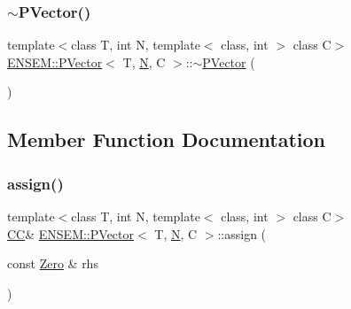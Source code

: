 \subsubsection{\texorpdfstring{$\sim$PVector()}{~PVector()}\hspace{0.1cm}{\footnotesize\ttfamily [3/3]}}
{\footnotesize\ttfamily template$<$class T, int N, template$<$ class, int $>$ class C$>$ \\
\mbox{\hyperlink{classENSEM_1_1PVector}{E\+N\+S\+E\+M\+::\+P\+Vector}}$<$ T, \mbox{\hyperlink{adat__devel_2lib_2hadron_2operator__name__util_8cc_a7722c8ecbb62d99aee7ce68b1752f337}{N}}, C $>$\+::$\sim$\mbox{\hyperlink{classENSEM_1_1PVector}{P\+Vector}} (\begin{DoxyParamCaption}{ }\end{DoxyParamCaption})\hspace{0.3cm}{\ttfamily [inline]}}



\subsection{Member Function Documentation}
\mbox{\label{classENSEM_1_1PVector_a2dec9eb5015ac1a8a261a20c08d9650c}} 
\subsubsection{\texorpdfstring{assign()}{assign()}\hspace{0.1cm}{\footnotesize\ttfamily [1/6]}}
{\footnotesize\ttfamily template$<$class T, int N, template$<$ class, int $>$ class C$>$ \\
\mbox{\hyperlink{classENSEM_1_1PVector_a92dc0a0a301a3dc96f7be5d337019bc7}{CC}}\& \mbox{\hyperlink{classENSEM_1_1PVector}{E\+N\+S\+E\+M\+::\+P\+Vector}}$<$ T, \mbox{\hyperlink{adat__devel_2lib_2hadron_2operator__name__util_8cc_a7722c8ecbb62d99aee7ce68b1752f337}{N}}, C $>$\+::assign (\begin{DoxyParamCaption}\item[{const \mbox{\hyperlink{structENSEM_1_1Zero}{Zero}} \&}]{rhs }\end{DoxyParamCaption})\hspace{0.3cm}{\ttfamily [inline]}}



